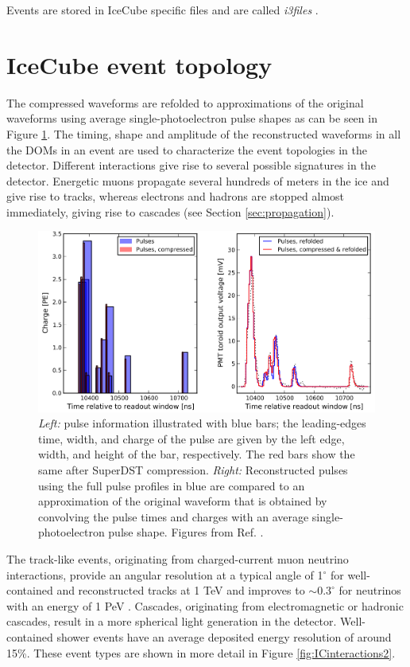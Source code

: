 \noindent Events are stored in IceCube specific files and are called \textit{i3files} .

\section{IceCube event topology}
The compressed waveforms are refolded to approximations of the original waveforms using average single-photoelectron pulse shapes as can be seen in Figure \ref{fig:waveform}. The timing, shape and amplitude of the reconstructed waveforms in all the DOMs in an event are used to characterize the event topologies in the detector. Different interactions give rise to several possible signatures in the detector. Energetic muons propagate several hundreds of meters in the ice and give rise to tracks, whereas electrons and hadrons are stopped almost immediately, giving rise to cascades (see Section \ref{sec:propagation}).

\begin{figure}[t]
\centering
\includegraphics[width=\textwidth]{chapter5/img/waveform.png}
\caption{\textit{Left:} pulse information illustrated with blue bars; the leading-edges time, width, and charge of the pulse are given by the left edge, width, and height of the bar, respectively. The red bars show the same after SuperDST compression. \textit{Right: }Reconstructed pulses using the full pulse profiles in blue are compared to an approximation of the original waveform that is obtained by convolving the pulse times and charges with an average single-photoelectron pulse shape. Figures from Ref. \cite{waveforms}.}
\label{fig:waveform}
\end{figure}

The track-like events, originating from charged-current muon neutrino interactions, provide an angular resolution at a typical angle of 1$^\circ$ for well-contained and reconstructed tracks at 1 TeV and improves to $\sim 0.3^\circ$ for neutrinos with an energy of 1 PeV \cite{Aartsen:2018ywr}. Cascades, originating from electromagnetic or hadronic cascades, result in a more spherical light generation in the detector. Well-contained shower events have an average deposited energy resolution of around 15\%. These event types are shown in more detail in Figure \ref{fig:ICinteractions2}.
 

